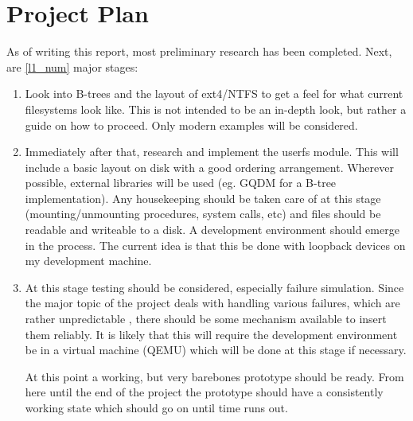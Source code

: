 %
%
\section{Project Plan}

    As of writing this report, most preliminary research has been completed.
    Next, are \ref{l1_num} major stages:


    \begin{enumerate}

        \item Look into B-trees and the layout of ext4/NTFS to get a feel for
            what current filesystems look like. This is not intended to be an
            in-depth look, but rather a guide on how to proceed. Only modern
            examples will be considered.

        \item Immediately after that, research and implement the userfs module.
            This will include a basic layout on disk with a good ordering
            arrangement. Wherever possible, external libraries will be used
            (eg. GQDM for a B-tree implementation). Any housekeeping should be
            taken care of at this stage (mounting/unmounting procedures, system
            calls, etc) and files should be readable and writeable to a disk. A
            development environment should emerge in the process. The current
            idea is that this be done with loopback devices on my development
            machine.

        \item At this stage testing should be considered, especially failure
            simulation. Since the major topic of the project deals with
            handling various failures, which are rather unpredictable
            \cite{google_flash}, there should be some mechanism available to
            insert them reliably. It is likely that this will require the
            development environment be in a virtual machine (QEMU) which will
            be done at this stage if necessary.

            At this point a working, but very barebones prototype should be
            ready. From here until the end of the project the prototype should
            have a consistently working state which should go on until time
            runs out.


\end{enumerate}
